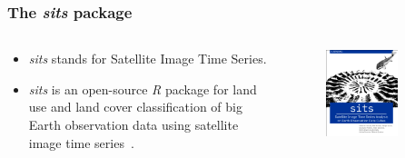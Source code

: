 \documentclass[aspectratio=169]{beamer}
\begin{document}
\begin{frame}
    \frametitle{The \emph{sits} package}
    \begin{columns}
        \begin{column}{0.5\textwidth}
            \begin{itemize}
                \item \emph{sits} stands for Satellite Image Time Series. 
                \item \emph{sits} is an open-source \textit{R} package for land 
                    use and land cover classification of big Earth observation 
                    data using satellite image time 
                    series~\cite{gilbertocamara2023}.
            \end{itemize}
        \end{column}
        \begin{column}{0.5\textwidth}
            \begin{figure}
                \centering
                \includegraphics[width=0.7\textwidth]
                {img/sits_book.png}
            \end{figure}
        \end{column}
    \end{columns}
\end{frame}
\end{document}
